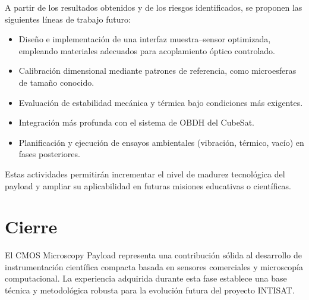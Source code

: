 A partir de los resultados obtenidos y de los riesgos identificados, se proponen
las siguientes líneas de trabajo futuro:

\begin{itemize}
    \item Diseño e implementación de una interfaz muestra--sensor optimizada,
    empleando materiales adecuados para acoplamiento óptico controlado.
    \item Calibración dimensional mediante patrones de referencia, como
    microesferas de tamaño conocido.
    \item Evaluación de estabilidad mecánica y térmica bajo condiciones más
    exigentes.
    \item Integración más profunda con el sistema de OBDH del CubeSat.
    \item Planificación y ejecución de ensayos ambientales (vibración, térmico,
    vacío) en fases posteriores.
\end{itemize}

Estas actividades permitirán incrementar el nivel de madurez tecnológica del
payload y ampliar su aplicabilidad en futuras misiones educativas o científicas.

\section{Cierre}

El CMOS Microscopy Payload representa una contribución sólida al desarrollo de
instrumentación científica compacta basada en sensores comerciales y
microscopía computacional. La experiencia adquirida durante esta fase establece
una base técnica y metodológica robusta para la evolución futura del proyecto
INTISAT.
